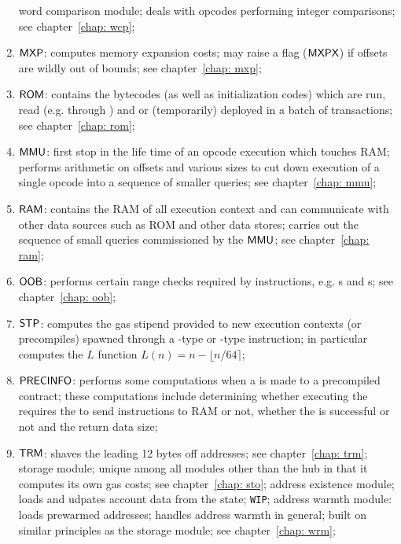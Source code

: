\begin{enumerate}
		word comparison module; deals with opcodes performing integer comparisons; see chapter~\ref{chap: wcp};
	\item $\textsf{MXP}{}$:
		computes memory expansion costs; may raise a flag ($\textsf{MXPX}$) if offsets are wildly out of bounds; see chapter~\ref{chap: mxp};
	\item $\textsf{ROM}{}$:
		contains the bytecodes (as well as initialization codes) which are run, read (e.g. through ) and or (temporarily) deployed in a batch of transactions; see chapter~\ref{chap: rom};
	\item $\textsf{MMU}{}$:
		first stop in the life time of an opcode execution which touches RAM; performs arithmetic on offsets and various sizes to cut down execution of a single opcode into a sequence of smaller queries; see chapter~\ref{chap: mmu};
	\item $\textsf{RAM}{}$:
		contains the RAM of all execution context and can communicate with other data sources such as ROM and other data stores; carries out the sequence of small queries commissioned by the $\textsf{MMU}{}$; see chapter~\ref{chap: ram};
	\item $\textsf{OOB}{}$:
		performs certain range checks required by instructions, e.g. s and s; see chapter~\ref{chap: oob};
	\item $\textsf{STP}$:
		computes the gas stipend provided to new execution contexts (or precompiles) spawned through a -type or -type instruction; in particular computes the $L$ function $L(n) = n - \lfloor n/64 \rceil$; 
	\item $\textsf{PRECINFO}$:
		performs some computations when a  is made to a precompiled contract; these computations include determining whether executing the  requires the \hubMod{} to send instructions to RAM or not, whether the  is successful or not and the return data size; 
	\item $\textsf{TRM}{}$:
		shaves the leading 12 bytes off addresses; see chapter~\ref{chap: trm};
		storage module; unique among all modules other than the hub in that it computes its own gas costs; see chapter~\ref{chap: sto};
		address existence module; loads and udpates account data from the state; \texttt{WIP};
		address warmth module: loads prewarmed addresses; handles address warmth in general; built on similar principles as the storage module; see chapter~\ref{chap: wrm};
\end{enumerate}
